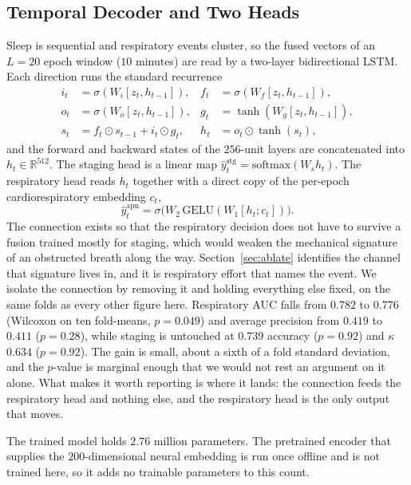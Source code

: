 \documentclass{ieeeaccess}
\newcommand{\mmAuc}{0.782}   %
\newcommand{\mmAp}{0.419}    %
\begin{document}
\subsection{Temporal Decoder and Two Heads}
Sleep is sequential and respiratory events cluster, so the fused vectors of an $L=20$ epoch
window ($10$ minutes) are read by a two-layer bidirectional LSTM. Each direction runs the
standard recurrence
\begin{align}
i_t&=\sigma(W_i[z_t,h_{t-1}]), & f_t&=\sigma(W_f[z_t,h_{t-1}]),\nonumber\\
o_t&=\sigma(W_o[z_t,h_{t-1}]), & g_t&=\tanh(W_g[z_t,h_{t-1}]),\\
s_t&=f_t\odot s_{t-1}+i_t\odot g_t, & h_t&=o_t\odot\tanh(s_t),\nonumber
\end{align}
and the forward and backward states of the $256$-unit layers are concatenated into
$h_t\in\mathbb{R}^{512}$. The
staging head is a linear map $\hat y^{\mathrm{stg}}_t=\mathrm{softmax}(W_s h_t)$. The
respiratory head reads $h_t$ together with a direct copy of the per-epoch cardiorespiratory
embedding $c_t$,
\begin{equation}
\hat y^{\mathrm{apn}}_t=\sigma\!\big(W_2\,\mathrm{GELU}(W_1[h_t;c_t])\big).
\end{equation}
The connection exists so that the respiratory decision does not have to survive a
fusion trained mostly for staging, which would weaken the mechanical signature of an
obstructed breath along the way. Section~\ref{sec:ablate} identifies the channel that
signature lives in, and it is respiratory effort that names the event. We isolate the connection by removing it and holding everything else fixed, on the
same folds as every other figure here. Respiratory AUC falls from $\mmAuc$ to
$0.776$ (Wilcoxon on ten fold-means, $p=0.049$) and average precision from $\mmAp$ to
$0.411$ ($p=0.28$), while staging is untouched at $0.739$ accuracy ($p=0.92$) and $\kappa$
$0.634$ ($p=0.92$). The gain
is small, about a sixth of a fold standard deviation, and the $p$-value is marginal enough
that we would not rest an argument on it alone. What makes it worth reporting is where it
lands: the connection feeds the respiratory head and nothing
else, and the respiratory head is the only output that moves.

The trained model holds $2.76$ million parameters. The pretrained encoder that supplies the
$200$-dimensional neural embedding is run once offline and is not trained here, so it adds no
trainable parameters to this count.
\end{document}
